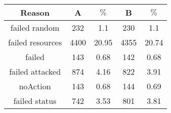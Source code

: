 \documentclass{article}
\begin{document}
\begin{tabular}{|c||c|c||c|c|}
\hline
Reason&A& $\%$&B& $\%$\\
\hline
failed random&232&1.1&230&1.1\\

failed resources&4400&20.95&4355&20.74\\

failed&143&0.68&142&0.68\\

failed attacked&874&4.16&822&3.91\\

noAction&143&0.68&144&0.69\\

failed status&742&3.53&801&3.81\\
\hline
\end{tabular}
\end{document}
